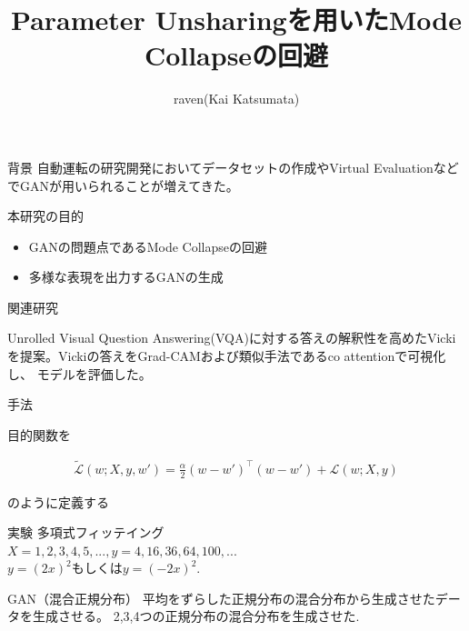 \documentclass[dvipdfmx,12pt,unicode]{beamer}
\title{Parameter Unsharingを用いたMode Collapseの回避}
\author{raven(Kai Katsumata)}
\institute[JPN]{SL B2 \\ 親 ryoga}
\begin{document}
\begin{frame}\frametitle{}
  \maketitle
\end{frame}

\begin{frame}{背景}
  自動運転の研究開発においてデータセットの作成やVirtual EvaluationなどでGANが用いられることが増えてきた。
\end{frame}

\begin{frame}{本研究の目的}

  \begin{itemize}
  \item GANの問題点であるMode Collapseの回避
  \item 多様な表現を出力するGANの生成
  \end{itemize}

\end{frame}

\begin{frame}{関連研究}

  \begin{block}{Unrolled}
    Visual Question Answering(VQA)に対する答えの解釈性を高めたVickiを提案。Vickiの答えをGrad-CAMおよび類似手法であるco attentionで可視化し、
    モデルを評価した。
  \end{block}

\end{frame}


\begin{frame}{手法}

目的関数を

\begin{eqnarray}
  \label{unshare}
  \tilde{\mathcal{L}}(w; X, y, w') =  \frac{\alpha}{2} (w - w')^{\top}(w - w')+ \mathcal{L}(w; X, y)  
\end{eqnarray}


のように定義する
  
\end{frame}

\begin{frame}{実験}
  多項式フィッテイング \\
  $X = {1, 2, 3, 4, 5,...}, y = {4, 16, 36, 64, 100,..}$. \\
  $y = (2x)^{2}$もしくは$y = (-2x)^{2}$.
\end{frame}
\begin{frame}
  GAN（混合正規分布）
  平均をずらした正規分布の混合分布から生成させたデータを生成させる。
  2,3,4つの正規分布の混合分布を生成させた.
\end{frame}
\end{document}
